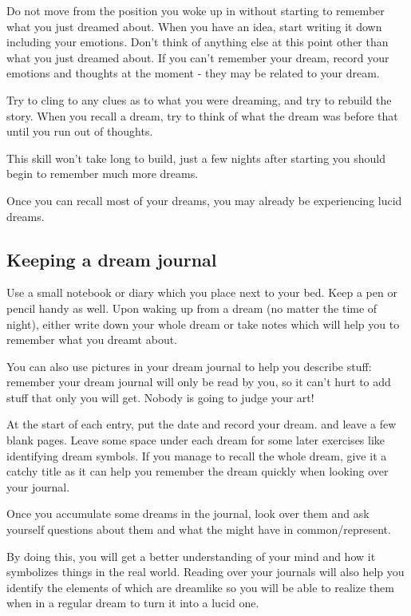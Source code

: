 \documentclass{report}
\begin{document}
Do not move from the position you woke up in without starting to remember what you just dreamed about. When you have an idea, start writing it down including your emotions. Don't think of anything else at this point other than what you just dreamed about. If you can't remember your dream, record your emotions and thoughts at the moment - they may be related to your dream.

Try to cling to any clues as to what you were dreaming, and try to rebuild the story. When you recall a dream, try to think of what the dream was before that until you run out of thoughts.

This skill won't take long to build, just a few nights after starting you should begin to remember much more dreams.

Once you can recall most of your dreams, you may already be experiencing lucid dreams.

\subsection{Keeping a dream journal}
Use a small notebook or diary which you place next to your bed. Keep a pen or pencil handy as well. Upon waking up from a dream (no matter the time of night), either write down your whole dream or take notes which will help you to remember what you dreamt about.

You can also use pictures in your dream journal to help you describe stuff: remember your dream journal will only be read by you, so it can't hurt to add stuff that only you will get. Nobody is going to judge your art!

At the start of each entry, put the date and record your dream. and leave a few blank pages. Leave some space under each dream for some later exercises like identifying dream symbols. If you manage to recall the whole dream, give it a catchy title as it can help you remember the dream quickly when looking over your journal.

Once you accumulate some dreams in the journal, look over them and ask yourself questions about them and what the might have in common/represent.

By doing this, you will get a better understanding of your mind and how it symbolizes things in the real world. Reading over your journals will also help you identify the elements of which are dreamlike so you will be able to realize them when in a regular dream to turn it into a lucid one.
\end{document}
